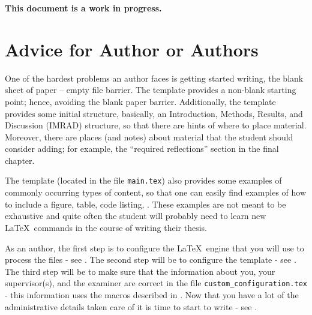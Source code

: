 \documentclass[main.tex]{subfiles}
\begin{document}
\noindent\textbf{This document is a work in progress.}


\section{Advice for Author or Authors}
\label{sec:authors}
One of the hardest problems an author faces is getting started writing, \ie the blank sheet of paper -- empty file barrier. The template provides a \mbox{non-blank} starting point; hence, avoiding the blank paper barrier. Additionally, the template provides some initial structure, basically, an Introduction, Methods, Results, and Discussion (IMRAD) structure, so that there are hints of where to place material. Moreover, there are places (and notes) about material that the student should consider adding; for example, the ``required reflections'' section in the final chapter.

The template (located in the file \texttt{main.tex}) also provides some examples of commonly occurring types of content, so that one can easily find examples of how to include a figure, table, code listing, \etc. These examples are not meant to be exhaustive and quite often the student will probably need to learn new \LaTeX\  commands in the course of writing their thesis.

As an author, the first step is to configure the \LaTeX\  engine that you will use to process the files - see . The second step will be to configure the template - see . The third step will be to make sure that the information about you, your supervisor(s), and the examiner are correct in the file \texttt{custom\_configuration.tex} - this information uses the macros described in . Now that you have a lot of the administrative details taken care of it is time to start to write - see .
\end{document}
